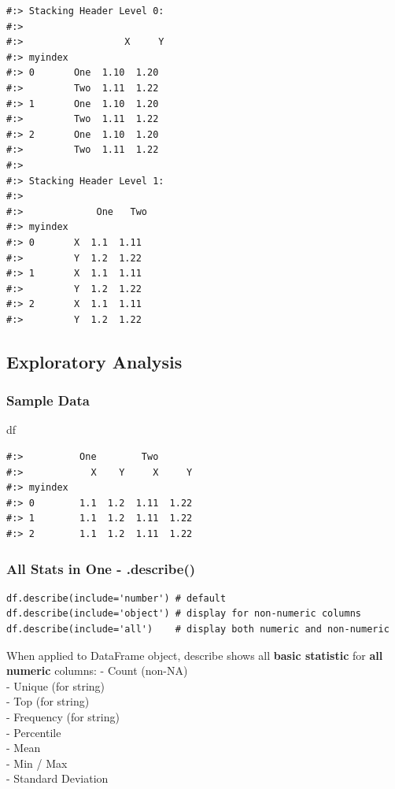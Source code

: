 \documentclass[
]{book}
\newenvironment{Shaded}{\begin{snugshade}}{\end{snugshade}}
\newcommand{\NormalTok}[1]{#1}
\begin{document}
\begin{verbatim}
#:> Stacking Header Level 0: 
#:> 
#:>                  X     Y
#:> myindex                
#:> 0       One  1.10  1.20
#:>         Two  1.11  1.22
#:> 1       One  1.10  1.20
#:>         Two  1.11  1.22
#:> 2       One  1.10  1.20
#:>         Two  1.11  1.22 
#:> 
#:> Stacking Header Level 1: 
#:> 
#:>             One   Two
#:> myindex             
#:> 0       X  1.1  1.11
#:>         Y  1.2  1.22
#:> 1       X  1.1  1.11
#:>         Y  1.2  1.22
#:> 2       X  1.1  1.11
#:>         Y  1.2  1.22
\end{verbatim}

\hypertarget{exploratory-analysis}{%
\subsection{Exploratory Analysis}\label{exploratory-analysis}}

\hypertarget{sample-data-12}{%
\subsubsection{Sample Data}\label{sample-data-12}}

\begin{Shaded}
\begin{Highlighting}[]
\NormalTok{df}
\end{Highlighting}
\end{Shaded}

\begin{verbatim}
#:>          One        Two      
#:>            X    Y     X     Y
#:> myindex                      
#:> 0        1.1  1.2  1.11  1.22
#:> 1        1.1  1.2  1.11  1.22
#:> 2        1.1  1.2  1.11  1.22
\end{verbatim}

\hypertarget{all-stats-in-one---.describe}{%
\subsubsection{All Stats in One - .describe()}\label{all-stats-in-one---.describe}}

\begin{verbatim}
df.describe(include='number') # default
df.describe(include='object') # display for non-numeric columns
df.describe(include='all')    # display both numeric and non-numeric
\end{verbatim}

When applied to DataFrame object, describe shows all \textbf{basic statistic} for \textbf{all numeric} columns: - Count (non-NA)\\
- Unique (for string)\\
- Top (for string)\\
- Frequency (for string)\\
- Percentile\\
- Mean\\
- Min / Max\\
- Standard Deviation
\end{document}
